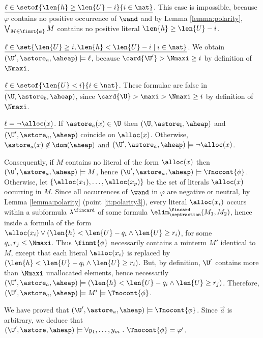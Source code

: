 \noindent
$\underline{\ell \in \setof{\len{h} \geq \len{U}-i}{i\in \nat}}$. This
case is impossible, because $\varphi$ contains no positive occurrence
of $\wand$ and by Lemma \ref{lemma:polarity}, $\bigvee_{M \in
  \finmt{\phi}} M$ contains no positive literal $\len{h} \geq
\len{U}-i$.

\noindent
$\underline{\ell \in \set{\len{U} \geq i, \len{h} < \len{U}-i \mid i
    \in \nat}}$. We obtain $(\U',\astore_a,\aheap) \models \ell$,
because $\card{\U'} > \Nmaxi \geq i$ by definition of $\Nmaxi$.

\noindent
$\underline{\ell \in \setof{\len{U} < i}{i\in\nat}}$.  These formulae
are false in $(\U,\astore_b,\aheap)$, since $\card{\U} > \maxi >
\Nmaxi \geq i$ by definition of $\Nmaxi$.

\noindent
$\underline{\ell = \neg\alloc(x)}$. If $\astore_a(x) \in \U$ then
$(\U,\astore_b,\aheap)$ and $(\U',\astore_a,\aheap)$ coincide on
$\alloc(x)$. Otherwise, $\astore_a(x) \not\in \dom(\aheap)$ and
$(\U',\astore_a,\aheap) \models \neg\alloc(x)$.

Consequently, if $M$ contains no literal of the form $\alloc(x)$ then
$(\U',\astore_a,\aheap) \models M$, hence $(\U',\astore_a,\aheap)
\models \Tnocont{\phi}$. Otherwise, let $\{ \alloc(x_1), \dots,
\alloc(x_p) \}$ be the set of literals $\alloc(x)$ occurring in $M$.
Since all occurrences of $\wand$ in $\varphi$ are negative or neutral,
by Lemma \ref{lemma:polarity} (point \ref{it:polarity3}), every
literal $\alloc(x_i)$ occurs within a subformula $\lambda^\fincard$ of
some formula $\elim^\fincard_\septraction(M_1,M_2)$, hence inside a
formula of the form $\alloc(x_i) \vee (\len{h} < \len{U} - q_i \wedge
\len{U} \geq r_i)$, for some $q_i,r_j \leq \Nmaxi$.  Thus
$\finmt{\phi}$ necessarily contains a minterm $M'$ identical to $M$,
except that each literal $\alloc(x_i)$ is replaced by $(\len{h} <
\len{U} - q_i \wedge \len{U} \geq r_i)$.  But, by definition, $\U'$
contains more than $\Nmaxi$ unallocated elements, hence necessarily
$(\U',\astore_a,\aheap) \models (\len{h} < \len{U} - q_i \wedge
\len{U} \geq r_j)$.  Therefore, $(\U',\astore_a,\aheap) \models M'
\models \Tnocont{\phi}$.

We have proved that $(\U',\astore_a, \aheap) \models \Tnocont{\phi}$.
Since $\vec{a}$ is arbitrary, we deduce that $(\U',\astore,\aheap)
\models \forall y_1,\dots,y_m~.~ \Tnocont{\phi} = \varphi'$.

